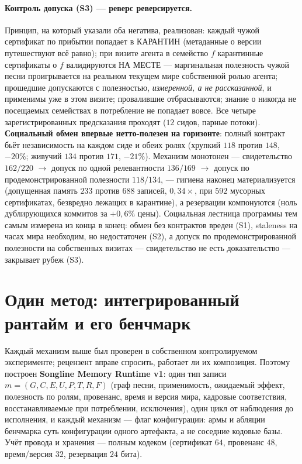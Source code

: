 \documentclass{article}
\begin{document}
\paragraph{Контроль допуска (S3) --- реверс реверсируется.} Принцип,
на который указали оба негатива, реализован: каждый чужой сертификат
по прибытии попадает в КАРАНТИН (метаданные о версии путешествуют
всё равно); при визите агента в семейство $f$ карантинные сертификаты
о $f$ валидируются НА МЕСТЕ --- маргинальная полезность чужой песни
проигрывается на реальном текущем мире собственной ролью агента;
прошедшие допускаются с полезностью, \emph{измеренной, а не
рассказанной}, и применимы уже в этом визите; провалившие
отбрасываются; знание о никогда не посещаемых семействах в
потребление не попадает вовсе. Все четыре зарегистрированных
предсказания проходят ($12$ сидов, парные потоки). \textbf{Социальный
обмен впервые нетто-полезен на горизонте}: полный контракт бьёт
независимость на каждом сиде и обеих ролях (хрупкий $118$ против
$148$, $-20\%$; живучий $134$ против $171$, $-21\%$). Механизм
монотонен --- свидетельство $162/220$ $\to$ допуск по одной
релевантности $136/169$ $\to$ допуск по продемонстрированной
полезности $118/134$, --- гигиена наконец материализуется (допущенная
память $233$ против $688$ записей, $0{,}34\times$, при $592$
мусорных сертификатах, безвредно лежащих в карантине), а резервации
компонуются (ноль дублирующихся коммитов за $+0{,}6\%$ цены).
Социальная лестница программы тем самым измерена из конца в конец:
обмен без контрактов вреден (S1), staleness на часах мира необходим,
но недостаточен (S2), а допуск по продемонстрированной полезности на
собственных визитах --- свидетельство не есть доказательство ---
закрывает рубеж (S3).


\section{Один метод: интегрированный рантайм и его бенчмарк}
\label{p5:sec:integration}

Каждый механизм выше был проверен в собственном контролируемом
эксперименте; рецензент вправе спросить, работает ли их композиция.
Поэтому построен \textbf{Songline Memory Runtime v1}: один тип записи
$m = (G, C, E, U, P, T, R, F)$ (граф песни, применимость, ожидаемый
эффект, полезность по ролям, провенанс, время и версия мира,
кадровые соответствия, восстанавливаемые при потреблении,
исключения), один цикл от наблюдения до исполнения, и каждый механизм
--- флаг конфигурации: армы и абляции бенчмарка суть конфигурации
одного артефакта, а не соседние кодовые базы. Учёт провода и
хранения --- полным кодеком (сертификат $64$, провенанс $48$,
время/версия $32$, резервация $24$ бита).
\end{document}

